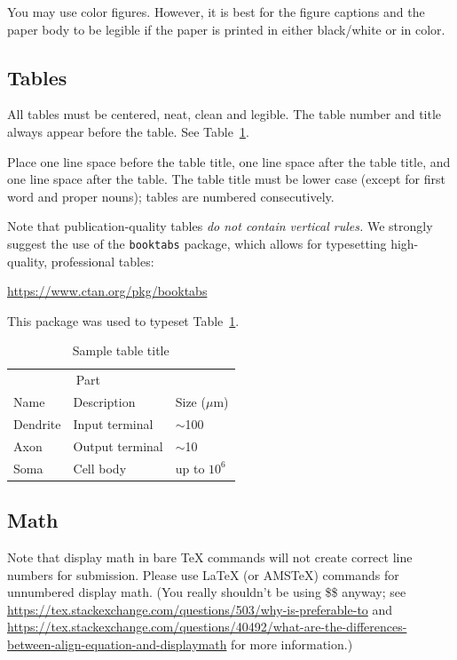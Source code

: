 \documentclass{article}
\begin{document}
\begin{CJK}{UTF8}{gbsn}
You may use color figures.  However, it is best for the figure captions and the
paper body to be legible if the paper is printed in either black/white or in
color.


\subsection{Tables}


All tables must be centered, neat, clean and legible.  The table number and
title always appear before the table.  See Table~\ref{sample-table}.


Place one line space before the table title, one line space after the
table title, and one line space after the table. The table title must
be lower case (except for first word and proper nouns); tables are
numbered consecutively.


Note that publication-quality tables \emph{do not contain vertical rules.} We
strongly suggest the use of the \verb+booktabs+ package, which allows for
typesetting high-quality, professional tables:
\begin{center}
  \url{https://www.ctan.org/pkg/booktabs}
\end{center}
This package was used to typeset Table~\ref{sample-table}.


\begin{table}
  \caption{Sample table title}
  \label{sample-table}
  \centering
  \begin{tabular}{lll}
    \toprule
    \multicolumn{2}{c}{Part}                   \\
    \cmidrule(r){1-2}
    Name     & Description     & Size ($\mu$m) \\
    \midrule
    Dendrite & Input terminal  & $\sim$100     \\
    Axon     & Output terminal & $\sim$10      \\
    Soma     & Cell body       & up to $10^6$  \\
    \bottomrule
  \end{tabular}
\end{table}

\subsection{Math}
Note that display math in bare TeX commands will not create correct line numbers for submission. Please use LaTeX (or AMSTeX) commands for unnumbered display math. (You really shouldn't be using \$\$ anyway; see \url{https://tex.stackexchange.com/questions/503/why-is-preferable-to} and \url{https://tex.stackexchange.com/questions/40492/what-are-the-differences-between-align-equation-and-displaymath} for more information.)


\end{CJK}
\end{document}
